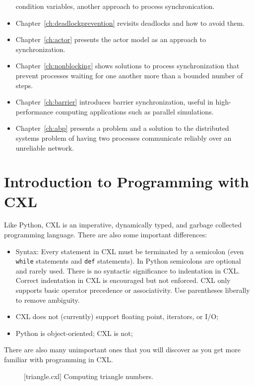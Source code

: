 \documentclass{report}
\newenvironment{code}{
\tcolorbox
}{
\endtcolorbox
}
\begin{document}
\begin{itemize}
condition variables, another approach to process synchronication.
\item Chapter~\ref{ch:deadlockprevention} revisits deadlocks and how to
avoid them.
\item Chapter~\ref{ch:actor} presents the actor model as an approach to
synchronization.
\item Chapter~\ref{ch:nonblocking} shows solutions to process synchronization
that prevent processes waiting for one another more than a bounded number of
steps.
\item Chapter~\ref{ch:barrier} introduces barrier synchronization, useful in
high-performance computing applications such as parallel simulations.
\item Chapter~\ref{ch:abp} presents a problem and a solution to the distributed
systems problem of having two processes communicate reliably over an unreliable
network.
\end{itemize}

\chapter{Introduction to Programming with CXL}
\label{ch:cxlintro}

Like Python, CXL is an imperative,
dynamically typed, and garbage collected programming language.
There are also some important differences:
\begin{itemize}
\item Syntax: Every statement in CXL must be terminated by a semicolon
(even \texttt{while} statements and \texttt{def} statements).
In Python semicolons are optional and rarely used.
There is no syntactic significance to indentation in CXL.
Correct indentation in CXL is encouraged but not enforced.
CXL only supports basic operator precedence or associativity.
Use parentheses liberally to remove ambiguity.
\item CXL does not (currently) support floating point, iterators, or I/O;
\item Python is object-oriented; CXL is not;
\end{itemize}
There are also many unimportant ones that you will discover as
you get more familiar with programming in CXL.

\begin{figure}
\begin{code}
\end{code}
\caption{[triangle.cxl] Computing triangle numbers.}
\label{fig:triangle}
\end{figure}
\end{document}
